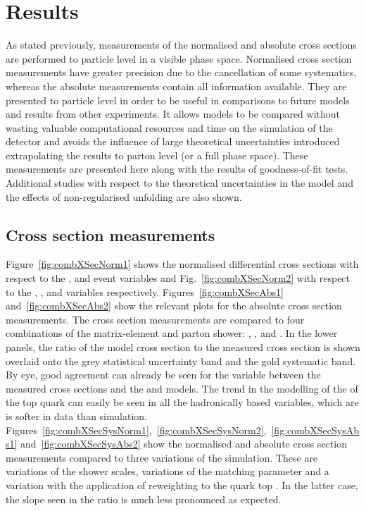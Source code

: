\chapter{Results}
\label{ch:xsection}

As stated previously, measurements of the normalised and absolute cross sections are performed to particle level in a visible phase space.
Normalised cross section measurements have greater precision due to the cancellation of some systematics, whereas the absolute measurements contain all information available.
They are presented to particle level in order to be useful in comparisons to future models and results from other experiments.
It allows models to be compared without wasting valuable computational resources and time on the simulation of the detector and avoids the influence of large theoretical uncertainties introduced extrapolating the results to parton level (or a full phase space). 
These measurements are presented here along with the results of \chisq{} goodness-of-fit tests.
Additional studies with respect to the theoretical uncertainties in the \ttbar{} model and the effects of non-regularised unfolding are also shown.

\section{Cross section measurements} %
\label{sec:cross_section_measurements}

Figure~\ref{fig:combXSecNorm1} shows the normalised differential cross sections with respect to the \NJET{}, \HT{} and \ST{} event variables and Fig.~\ref{fig:combXSecNorm2} with respect to the \ptmiss{}, \WPT{}, \LPT{} and \LETA{} variables respectively.
Figures~\ref{fig:combXSecAbs1} and~\ref{fig:combXSecAbs2} show the relevant plots for the absolute cross section measurements.
The cross section measurements are compared to four combinations of the matrix-element and parton shower: \powhegpythia{}, \powhegherwig{}, \mgamcFxFxpythia{} and \mgamcMLMpythia{}.
In the lower panels, the ratio of the model cross section to the measured cross section is shown overlaid onto the grey statistical uncertainty band and the gold systematic band.
By eye, good agreement can already be seen for the \NJET{} variable between the measured cross sections and the \powhegpythia{} and \mgamcFxFxpythia{} models.
The trend in the modelling of the \pt{} of the top quark can easily be seen in all the hadronically based variables, which are is softer in data than simulation.
Figures~\ref{fig:combXSecSysNorm1},~\ref{fig:combXSecSysNorm2},~\ref{fig:combXSecSysAbs1} and~\ref{fig:combXSecSysAbs2} show the normalised and absolute cross section measurements compared to three variations of the \powhegpythia{} simulation.
These are variations of the shower scales, variations of the \hdamp{} matching parameter and a variation with the application of reweighting to the quark top \pt{}.
In the latter case, the slope seen in the ratio is much less pronounced as expected.

